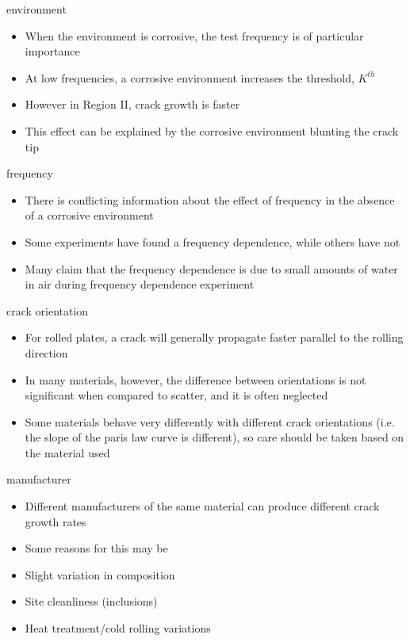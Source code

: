 \documentclass[10pt]{beamer}
\begin{document}
\begin{frame}{environment}
	\begin{itemize}[<+->]
		\item When the environment is corrosive, the test frequency is of particular importance
		\item At low frequencies, a corrosive environment increases the threshold, $K^{th}$
		\item However in Region II, crack growth is faster
		\item This effect can be explained by the corrosive environment blunting the crack tip
	\end{itemize}
\end{frame}

\begin{frame}{frequency}
	\begin{itemize}[<+->]
		\item There is conflicting information about the effect of frequency in the absence of a corrosive environment
		\item Some experiments have found a frequency dependence, while others have not
		\item Many claim that the frequency dependence is due to small amounts of water in air during frequency dependence experiment
	\end{itemize}
\end{frame}

\begin{frame}{crack orientation}
	\begin{itemize}[<+->]
		\item For rolled plates, a crack will generally propagate faster parallel to the rolling direction
		\item In many materials, however, the difference between orientations is not significant when compared to scatter, and it is often neglected
		\item Some materials behave very differently with different crack orientations (i.e. the slope of the paris law curve is different), so care should be taken based on the material used
	\end{itemize}
\end{frame}

\begin{frame}{manufacturer}
	\begin{itemize}[<+->]
		\item Different manufacturers of the same material can produce different crack growth rates
		\item Some reasons for this may be
		\item Slight variation in composition
		\item Site cleanliness (inclusions)
		\item Heat treatment/cold rolling variations
	\end{itemize}
\end{frame}
\end{document}
